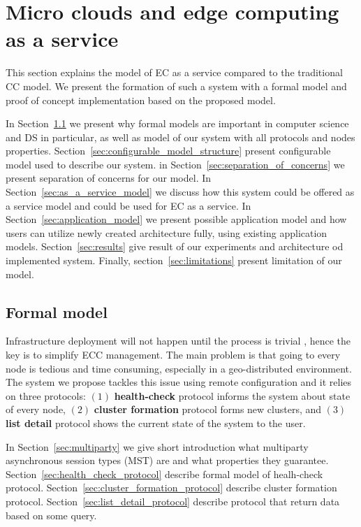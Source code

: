 \chapter{Micro clouds and edge computing as a service}\label{chapter:Micro_clouds}
%
This section explains the model of EC as a service compared to the traditional CC model. We present the formation of such a system with a formal model and proof of concept implementation based on the proposed model.

In Section~\ref{sec:formal_model} we present why formal models are important in computer science and DS in particular, as well as model of our system with all protocols and nodes properties. Section~\ref{sec:configurable_model_structure} present configurable model used to describe our system. in Section~\ref{sec:separation_of_concerns} we present separation of concerns for our model. In Section~\ref{sec:as_a_service_model} we discuss how this system could be offered as a service model and could be used for EC as a service. In Section~\ref{sec:application_model} we present possible application model and how users can utilize newly created architecture fully, using existing application models. Section~\ref{sec:results} give result of our experiments and architecture od implemented system. Finally, section~\ref{sec:limitations} present limitation of our model.
%
%
\section{Formal model}\label{sec:formal_model}
%
Infrastructure deployment will not happen until the process is trivial \cite{SatyanarayananBCD09}, hence the key is to simplify ECC management. The main problem is that going to every node is tedious and time consuming, especially in a geo-distributed environment. The system we propose tackles this issue using remote configuration and it relies on three protocols: $(1)$ \textbf{health-check} protocol informs the system about state of every node, $(2)$ \textbf{cluster formation} protocol forms new clusters, and $(3)$ \textbf{list detail} protocol shows the current state of the system to the user.

In Section~\ref{sec:multiparty} we give short introduction what multiparty asynchronous session types (MST) are and what properties they guarantee. Section~\ref{sec:health_check_protocol} describe formal model of healh-check protocol. Section~\ref{sec:cluster_formation_protocol} describe cluster formation protocol. Section~\ref{sec:list_detail_protocol} describe protocol that return data based on some query.
%
%
